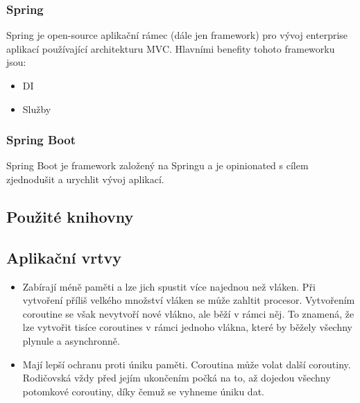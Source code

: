 \subsubsection *{Spring}
Spring je open-source aplikační rámec (dále jen framework) pro vývoj enterprise aplikací používající architekturu MVC. Hlavními benefity tohoto frameworku jsou:

\begin{itemize}
	\item DI
	\item Služby
\end{itemize}

\subsubsection *{Spring Boot}

Spring Boot je framework založený na Springu a je opinionated s cílem zjednodušit a urychlit vývoj  aplikací.

\subsection {Použité knihovny}

\subsection*{Aplikační vrtvy}

\begin{itemize}
	\item Zabírají méně paměti a lze jich spustit více najednou než vláken. Při vytvoření příliš velkého množství vláken se může zahltit procesor. Vytvořením coroutine se však nevytvoří nové vlákno, ale běží v rámci něj. To znamená, že lze vytvořit tisíce coroutines v rámci jednoho vlákna, které by běžely všechny plynule a asynchronně.
	\item Mají lepší ochranu proti úniku paměti.
	Coroutina může volat další coroutiny. Rodičovská vždy před jejím ukončením počká na to, až dojedou všechny potomkové coroutiny, díky čemuž se vyhneme úniku dat.
\end{itemize}